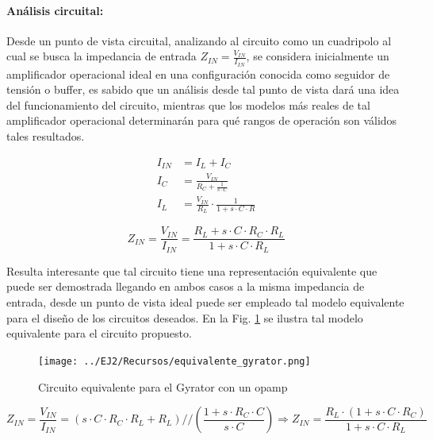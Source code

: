 \paragraph*{An\'alisis circuital: } Desde un punto de vista circuital, analizando al circuito como un cuadripolo al cual se busca la impedancia de entrada $Z_{IN} = \frac{V_{IN}}{I_{IN}}$, se considera inicialmente un amplificador operacional ideal en una configuraci\'on conocida como seguidor de tensi\'on o buffer, es sabido que un an\'alisis desde tal punto de vista
dar\'a una idea del funcionamiento del circuito, mientras que los modelos m\'as reales de tal amplificador operacional determinar\'an para qu\'e rangos de operaci\'on son v\'alidos tales resultados.

\begin{eqnarray*}
    I_{IN} & = I_L + I_C \\
    I_C & = \frac{V_{IN}}{R_C + \frac{1}{s \cdot C}} \\
    I_L & = \frac{V_{IN}}{R_L} \cdot \frac{1}{1 + s \cdot C \cdot R}
\end{eqnarray*}

\begin{equation}
    Z_{IN} = \frac{V_{IN}}{I_{IN}} = \frac{R_L + s \cdot C \cdot R_C \cdot R_L}{1 + s \cdot C \cdot R_L}
\end{equation}

Resulta interesante que tal circuito tiene una representaci\'on equivalente que puede ser demostrada llegando en ambos casos a la misma impedancia de entrada,
desde un punto de vista ideal puede ser empleado tal modelo equivalente para el dise\~no de los circuitos deseados. En la Fig. \ref{fig:equivalente_gyrator} se ilustra tal modelo equivalente para el circuito propuesto.

\begin{figure}[H]
    \centering
    \texttt{[image: ../EJ2/Recursos/equivalente\_gyrator.png]}
    \caption{Circuito equivalente para el Gyrator con un opamp}
    \label{fig:equivalente_gyrator}
\end{figure}

\begin{equation}
    Z_{IN} = \frac{V_{IN}}{I_{IN}} = (s \cdot C \cdot R_C \cdot R_L + R_L) // (\frac{1 + s \cdot R_C \cdot C}{s \cdot C})
    \Rightarrow Z_{IN} = \frac{R_L \cdot (1 + s \cdot C \cdot R_C)}{1 + s \cdot C \cdot R_L}
\end{equation}


